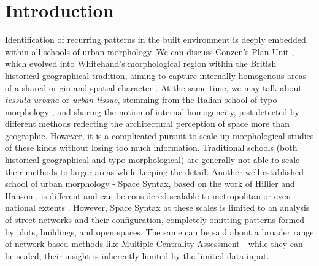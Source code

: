 \section{Introduction}
\label{sec:intro}

Identification of recurring patterns in the built environment is deeply embedded within
all schools of urban morphology. We can discuss Conzen's Plan Unit \citep{conzen1960},
which evolved into Whitehand's morphological region within the British
historical-geographical tradition, aiming to capture internally homogenous areas of a
shared origin and spatial character \citep{oliveira2020}. At the same time, we may talk
about \textit{tessuta urbana} or \textit{urban tissue}, stemming from the Italian school
of typo-morphology \citep{caniggia2001}, and sharing the notion of internal homogeneity,
just detected by different methods reflecting the architectural perception of space more
than geographic. However, it is a complicated pursuit to scale up morphological studies
of these kinds without losing too much information. Traditional schools (both
historical-geographical and typo-morphological) are generally not able to scale their
methods to larger areas while keeping the detail. Another well-established school of
urban morphology - Space Syntax, based on the work of Hillier and Hanson
\citep{hillier1996}, is different and can be considered scalable to metropolitan or even
national extents \citep{spacesyntaxlimited2018}. However, Space Syntax at these scales
is limited to an analysis of street networks and their configuration, completely
omitting patterns formed by plots, buildings, and open spaces. The same can be said
about a broader range of network-based methods like Multiple Centrality Assessment
\citep{porta2010} - while they can be scaled, their insight is inherently limited by the
limited data input.

